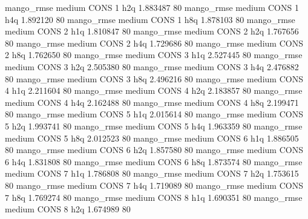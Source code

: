        mango_rmse     medium     CONS                 1                  h2q  1.883487 80
       mango_rmse     medium     CONS                 1                  h4q  1.892120 80
       mango_rmse     medium     CONS                 1                  h8q  1.878103 80
       mango_rmse     medium     CONS                 2                  h1q  1.810847 80
       mango_rmse     medium     CONS                 2                  h2q  1.767656 80
       mango_rmse     medium     CONS                 2                  h4q  1.729686 80
       mango_rmse     medium     CONS                 2                  h8q  1.762650 80
       mango_rmse     medium     CONS                 3                  h1q  2.527445 80
       mango_rmse     medium     CONS                 3                  h2q  2.505380 80
       mango_rmse     medium     CONS                 3                  h4q  2.476882 80
       mango_rmse     medium     CONS                 3                  h8q  2.496216 80
       mango_rmse     medium     CONS                 4                  h1q  2.211604 80
       mango_rmse     medium     CONS                 4                  h2q  2.183857 80
       mango_rmse     medium     CONS                 4                  h4q  2.162488 80
       mango_rmse     medium     CONS                 4                  h8q  2.199471 80
       mango_rmse     medium     CONS                 5                  h1q  2.015614 80
       mango_rmse     medium     CONS                 5                  h2q  1.993741 80
       mango_rmse     medium     CONS                 5                  h4q  1.963359 80
       mango_rmse     medium     CONS                 5                  h8q  2.012523 80
       mango_rmse     medium     CONS                 6                  h1q  1.886505 80
       mango_rmse     medium     CONS                 6                  h2q  1.857580 80
       mango_rmse     medium     CONS                 6                  h4q  1.831808 80
       mango_rmse     medium     CONS                 6                  h8q  1.873574 80
       mango_rmse     medium     CONS                 7                  h1q  1.786808 80
       mango_rmse     medium     CONS                 7                  h2q  1.753615 80
       mango_rmse     medium     CONS                 7                  h4q  1.719089 80
       mango_rmse     medium     CONS                 7                  h8q  1.769274 80
       mango_rmse     medium     CONS                 8                  h1q  1.690351 80
       mango_rmse     medium     CONS                 8                  h2q  1.674989 80
